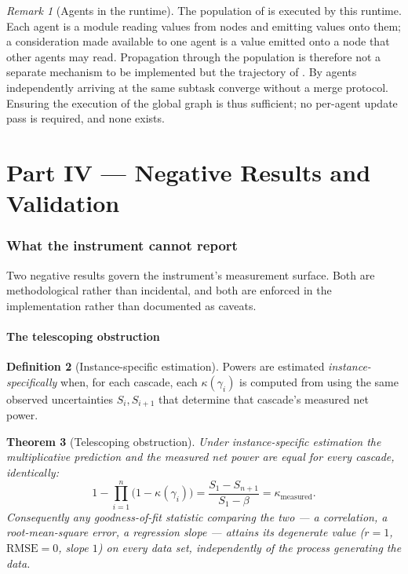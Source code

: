 \documentclass[11pt,a4paper]{article}
\theoremstyle{clstyle}
\newtheorem{theorem}{Theorem}[section]
\theoremstyle{definition}
\newtheorem{definition}[theorem]{Definition}
\theoremstyle{remark}
\newtheorem{remark}[theorem]{Remark}
\newcommand{\flo}{\beta}
\begin{document}
\begin{remark}[Agents in the runtime]
\label{rem:agents-runtime}
The population of  is executed by this runtime. Each
agent is a module reading values from nodes and emitting values onto them; a
consideration made available to one agent is a value emitted onto a node that
other agents may read. Propagation through the population is therefore not a
separate mechanism to be implemented but the trajectory of
. By  agents independently
arriving at the same subtask converge without a merge protocol. Ensuring the
execution of the global graph is thus sufficient; no per-agent update pass is
required, and none exists.
\end{remark}

\part*{Part IV --- Negative Results and Validation}

\section{What the instrument cannot report}
\label{sec:negative}

Two negative results govern the instrument's measurement surface. Both are
methodological rather than incidental, and both are enforced in the
implementation rather than documented as caveats.

\subsection{The telescoping obstruction}

\begin{definition}[Instance-specific estimation]
\label{def:instance}
Powers are estimated \emph{instance-specifically} when, for each cascade,
each $\kappa(\gamma_i)$ is computed from  using the same
observed uncertainties $S_i,S_{i+1}$ that determine that cascade's measured
net power.
\end{definition}

\begin{theorem}[Telescoping obstruction]
\label{thm:telescoping}
Under instance-specific estimation the multiplicative prediction and the
measured net power are equal for every cascade, identically:
\[
1-\prod_{i=1}^{n}\bigl(1-\kappa(\gamma_i)\bigr)
=\frac{S_1-S_{n+1}}{S_1-\flo}
=\kappa_{\mathrm{measured}}.
\]
Consequently any goodness-of-fit statistic comparing the two --- a
correlation, a root-mean-square error, a regression slope --- attains its
degenerate value ($r=1$, $\mathrm{RMSE}=0$, slope $1$) on \emph{every} data
set, independently of the process generating the data.
\end{theorem}
\end{document}
